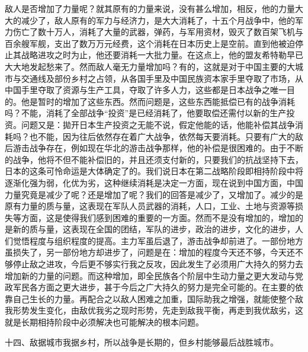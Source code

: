 敌人是否增加了力量呢？就其原有的力量来说，没有甚么增加，相反，他的力量大大的减少了，敌人原有的军力与经济力，是大大消耗了，十五个月战争中，他的军力伤亡了数十万人，消耗了大量的武器，弹药，与军用资材，毁灭了数百架飞机与百余艘军舰，支出了数万万元经费，这个消耗在日本历史上是空前。直到他被迫停止其战略进攻之时为止，他还要消耗一大批力量。在这点上，他的盟友希特勒早已大大地发起愁来了。然而敌人毫无力量增加吗？有的，这就是对于中国主要的大城市与交通线及部份乡村之占领，从各国手里及中国民族资本家手里夺取了市场，从中国手里夺取了资源与生产工具，夺取了许多人力，这些都是日本战争之唯一目的。他是暂时的增加了这些东西。然而问题是，这些东西能抵偿已有的战争消耗吗？不能，消耗了全部战争“投资”是已经消耗了，他要取偿还需付以新的生产投资。问题又是：拋开日本生产投资之无能不说，假定他能的话，他能补偿其战争消耗吗？也不能，因为往后依然存在着广大战争，依然每天要消耗。只要有广大的敌后游击战争存在，例如现在华北的游击战争那样，他的补偿是很困难的。由于不断的战争，他将不但不能补偿旧的，并且还须支付新的，只要我们的抗战坚持下去，日本的这条可怜命运是大体确定了的。我们说日本在第二战略阶段即相持阶段中将逐渐化强为弱，化优为劣，这种继续消耗是决定一方面，现在说到中国方面，中国力量究竟是减少了呢？还是增加了呢？我们的回答是减少了，又增加了。减少的是原有力量的质与量，这表现在军队人员武器的消耗，人口，工业、土地与资源等损失等方面，这是使得我们感到困难的重要的一方面。然而不是没有增加的，增加的是新的质与量，这表现在全国的团结，军队的进步，政治的进步，文化的进步，人们觉悟程度与组织程度的提高。主力军虽后退了，游击战争却前进了。一部份地方虽损失了，另一部份地方却进步了，问题是在：增加的程度今天还不够，今天还不够停止敌之进攻，今后更不够实行我之反攻，因此发生了必须用广大持久的努力去增加新的力量的问题。而这种增加，即全民族各个阶层中生动力量之更大发动与党政军民各方面之更大进步，甚于今后之广大持久的努力是完全可能的。在主要的依靠自己生长的力量。再配合之以敌人困难之加重，国际助我之增强，就能使整个敌我形势发生变化，由敌优我劣之现时形势，先走到敌我平衡，再走到我优敌劣，这就是长期相持阶段中必须解决也可能解决的根本问题。

十四、敌据城市我据乡村，所以战争是长期的，但乡村能够最后战胜城市。

